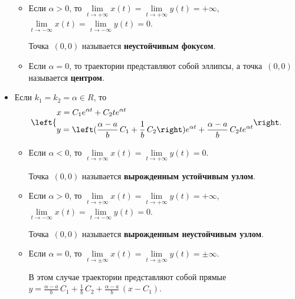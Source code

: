\begin{itemize}
\begin{itemize}
		\item Если $\alpha > 0$, то
		$\lim\limits_{t \to +\infty} x(t) = \lim\limits_{t \to +\infty} y(t) = +\infty$,
		$\lim\limits_{t \to -\infty} x(t) = \lim\limits_{t \to -\infty} y(t) = 0$.
		
		Точка~$(0, 0)$ называется \textbf{неустойчивым фокусом}.
		
		\item Если $\alpha = 0$, то траектории представляют собой эллипсы, а точка~$(0, 0)$ называется \textbf{центром}.
	\end{itemize}
	
	\item Если $k_1 = k_2 = \alpha \in R$, то
	\begin{equation*}
	\begin{dcases}
	x = C_1 e^{\alpha t} + C_2 t e^{\alpha t} \\
	y = \left(\frac{\alpha - a}b\,C_1 + \frac1b\,C_2\right) e^{\alpha t} +
	\frac{\alpha - a}b\,C_2 t e^{\alpha t}
	\end{dcases}
	\end{equation*}
	
	\begin{itemize}
		\item Если $\alpha < 0$, то
		$\lim\limits_{t \to +\infty} x(t) = \lim\limits_{t \to +\infty} y(t) = 0$.
		
		Точка~$(0, 0)$ называется \textbf{вырожденным устойчивым узлом}.
		
		\item Если $\alpha > 0$, то
		$\lim\limits_{t \to +\infty} x(t) = \lim\limits_{t \to +\infty} y(t) = +\infty$,
		$\lim\limits_{t \to -\infty} x(t) = \lim\limits_{t \to -\infty} y(t) = 0$.
		
		Точка~$(0, 0)$ называется \textbf{вырожденным неустойчивым узлом}.
		
		\item Если $\alpha = 0$, то
		$\lim\limits_{t \to \pm\infty} x(t) = \lim\limits_{t \to \pm\infty} y(t) = \pm\infty$.
		
		В этом случае траектории представляют собой прямые~$y = \frac{\alpha - a}b\,C_1 + \frac1b\,C_2 + \frac{\alpha - a}b\,(x - C_1)$.
	\end{itemize}
\end{itemize}

